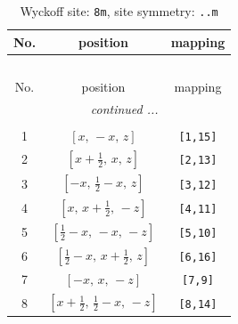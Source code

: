 \documentclass[fleqn,8pt]{jsarticle}
\begin{document}
\begin{longtable}{ccc}
\caption{Wyckoff site: {\tt 8m}, site symmetry: {\tt ..m}}
 \\
 \hline \hline
No. & position & mapping \\ \hline \endfirsthead

\multicolumn{2}{l}{\tablename\ \thetable{}} \\
 \hline \hline
No. & position & mapping \\ \hline \endhead

 \hline \hline
\multicolumn{2}{r}{\footnotesize\it continued ...} \\ \endfoot

 \hline \hline
\multicolumn{2}{r}{} \\ \endlastfoot

1 & $\left[ x,\, - x,\, z \right]$ & {\tt [1,15]} \\ \hline
2 & $\left[ x + \frac{1}{2},\, x,\, z \right]$ & {\tt [2,13]} \\ \hline
3 & $\left[ - x,\, \frac{1}{2} - x,\, z \right]$ & {\tt [3,12]} \\ \hline
4 & $\left[ x,\, x + \frac{1}{2},\, - z \right]$ & {\tt [4,11]} \\ \hline
5 & $\left[ \frac{1}{2} - x,\, - x,\, - z \right]$ & {\tt [5,10]} \\ \hline
6 & $\left[ \frac{1}{2} - x,\, x + \frac{1}{2},\, z \right]$ & {\tt [6,16]} \\ \hline
7 & $\left[ - x,\, x,\, - z \right]$ & {\tt [7,9]} \\ \hline
8 & $\left[ x + \frac{1}{2},\, \frac{1}{2} - x,\, - z \right]$ & {\tt [8,14]} \\
\end{longtable}
\renewcommand{\arraystretch}{1.2}
\end{document}
